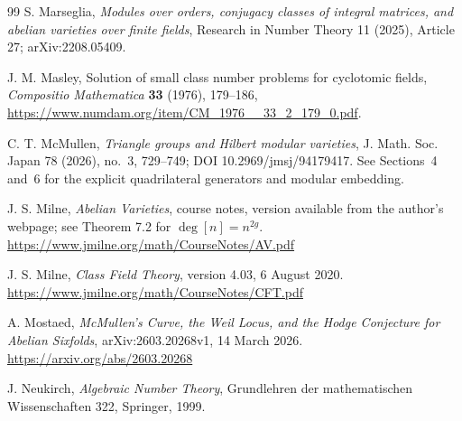 \begin{thebibliography}{99}
S. Marseglia,
\emph{Modules over orders, conjugacy classes of integral matrices, and abelian varieties over finite fields},
Research in Number Theory 11 (2025), Article 27; arXiv:2208.05409.

J. M. Masley,
Solution of small class number problems for cyclotomic fields,
\emph{Compositio Mathematica} \textbf{33} (1976), 179--186,
\url{https://www.numdam.org/item/CM_1976__33_2_179_0.pdf}.

C. T. McMullen,
\emph{Triangle groups and Hilbert modular varieties},
J. Math. Soc. Japan 78 (2026), no.~3, 729--749; DOI 10.2969/jmsj/94179417.  See Sections~4 and~6 for the explicit quadrilateral generators and modular embedding.

J. S. Milne,
\emph{Abelian Varieties}, course notes, version available from the author's webpage; see Theorem 7.2 for $\deg[n]=n^{2g}$.
\url{https://www.jmilne.org/math/CourseNotes/AV.pdf}

J. S. Milne,
\emph{Class Field Theory}, version 4.03, 6 August 2020.
\url{https://www.jmilne.org/math/CourseNotes/CFT.pdf}

A. Mostaed,
\emph{McMullen's Curve, the Weil Locus, and the Hodge Conjecture for Abelian Sixfolds},
arXiv:2603.20268v1, 14 March 2026.
\url{https://arxiv.org/abs/2603.20268}

J. Neukirch,
\emph{Algebraic Number Theory}, Grundlehren der mathematischen Wissenschaften 322, Springer, 1999.

\end{thebibliography}
